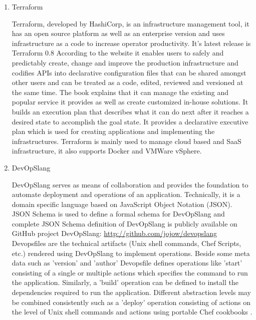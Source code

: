 \begin{enumerate}
\item {} 
Terraform

Terraform, developed by HashiCorp, is an infrastructure
management tool, it has an open source platform as well as an
enterprise version and uses infrastructure as a code to increase
operator productivity. It’s latest release is Terraform 0.8
According to the website \label{\detokenize{i524/technologies:id614}}{\hyperref[\detokenize{i524/technologies:www-terraform}]{\sphinxcrossref{{[}529{]}}}} it enables users
to safely and predictably create, change and improve the
production infrastructure and codifies APIs into declarative
configuration files that can be shared amongst other users and
can be treated as a code, edited, reviewed and versioned at the
same time. The book \label{\detokenize{i524/technologies:id615}}{\hyperref[\detokenize{i524/technologies:www-terraform-book}]{\sphinxcrossref{{[}530{]}}}} explains that it
can manage the existing and popular service it provides as well
as create customized in-house solutions. It builds an execution
plan that describes what it can do next after it reaches a
desired state to accomplish the goal state. It provides a
declarative executive plan which is used for creating
applications and implementing the infrastructures. Terraform is
mainly used to manage cloud based and SaaS infrastructure, it
also supports Docker and VMWare vSphere.

\item {} 
DevOpSlang

DevOpSlang serves as means of collaboration and provides the
foundation to automate deployment and operations of an
application. Technically, it is a domain specific language based
on JavaScript Object Notation (JSON). JSON Schema is used to
define a formal schema for DevOpSlang and complete JSON Schema
definition of DevOpSlang is publicly available on GitHub project
DevOpSlang: \url{http://github.com/jojow/devopslang} Devopsfiles are
the technical artifacts (Unix shell commands, Chef Scripts, etc.)
rendered using DevOpSlang to implement operations.  Beside some
meta data such as ’version’ and ’author’ Devopsfile defines
operations like ’start’ consisting of a single or multiple
actions which specifies the command to run the
application. Similarly, a ’build’ operation can be defined to
install the dependencies required to run the
application. Different abstraction levels may be combined
consistently such as a ’deploy’ operation consisting of actions
on the level of Unix shell commands and actions using portable
Chef cookbooks \label{\detokenize{i524/technologies:id616}}{\hyperref[\detokenize{i524/technologies:devopslang}]{\sphinxcrossref{{[}531{]}}}}.


\end{enumerate}
